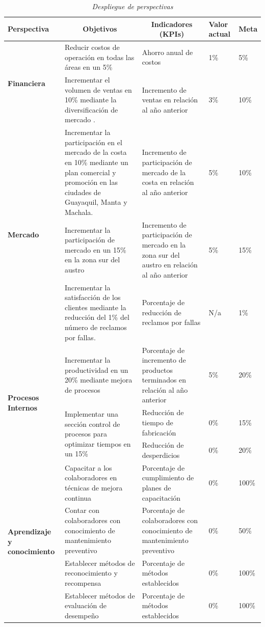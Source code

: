 \documentclass[12pt, a4paper]{article}
\begin{document}
\begin{table}[H]
\centering
\caption{\textit{{Despliegue de perspectivas}}}
\label{tabla:3}
\begin{tabular}{|p{2.5cm}|p{4.9cm}|p{4.6cm}|p{1cm}|p{1cm}|}
\hline
\textbf{Perspectiva} & \multicolumn{1}{c|}{\textbf{Objetivos}} & \multicolumn{1}{c|}{\textbf{Indicadores (KPIs)}} & \textbf{Valor actual} & \textbf{Meta} \\ \hline
\multirow{2}{2cm}{\textbf{Financiera}} & Reducir  costos de operación en todas las áreas en un 5\% & Ahorro anual de costos & 1\% & 5\% \\ \cline{2-5} 
 & Incrementar el volumen de ventas en  10\% mediante la diversificación de mercado . & Incremento de ventas en relación al año anterior & 3\% & 10\% \\ \hline
\multirow{3}{5cm}{\textbf{Mercado}} & Incrementar la participación en el mercado de la costa en  10\% mediante  un plan comercial y  promoción  en las ciudades de Guayaquil, Manta y Machala. & Incremento de participación de mercado de la costa en relación al año anterior & 5\% & 10\% \\ \cline{2-5} 
 & Incrementar la participación de mercado en un 15\% en la zona sur del austro  & Incremento de participación de mercado en la zona sur del austro en relación al año anterior & 5\% & 15\% \\ \cline{2-5} 
 & Incrementar la satisfacción de los clientes mediante la reducción del 1\% del número de reclamos por fallas. & Porcentaje de reducción de reclamos por fallas & N/a & 1\% \\ \hline
\multirow{3}{3cm}{\textbf{Procesos Internos}} & Incrementar la productividad en un 20\% mediante mejora de procesos & Porcentaje de incremento de productos terminados en relación al año anterior & 5\% & 20\% \\ \cline{2-5} 
 & \multirow{2}{4.7cm}{Implementar una sección control de procesos para optimizar tiempos en un 15\% } & Reducción de tiempo de fabricación & 0\% & 15\% \\ \cline{3-5} 
 &  & Reducción de desperdicios & 0\% & 20\% \\ \hline
\multirow{4}{2.2cm}{\textbf{Aprendizaje y conocimiento}} & Capacitar a los colaboradores en técnicas de mejora continua & Porcentaje de cumplimiento de planes de capacitación & 0\% & 100\% \\ \cline{2-5} 
 & Contar con colaboradores con conocimiento de mantenimiento preventivo & Porcentaje de colaboradores con conocimiento de mantenimiento preventivo & 0\% & 50\% \\ \cline{2-5} 
 & Establecer métodos de reconocimiento y recompensa  & Porcentaje de métodos establecidos & 0\% & 100\% \\ \cline{2-5} 
 & Establecer métodos de evaluación de desempeño & Porcentaje de métodos establecidos & 0\% & 100\% \\ \hline
\end{tabular}
\end{table}
\end{document}
